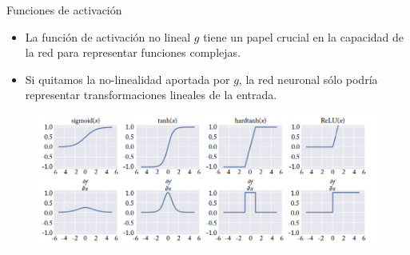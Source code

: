 \documentclass[handout]{beamer}
\begin{document}
\begin{frame}{Funciones de activación}

\begin{scriptsize}
\begin{itemize}
\item La función de activación no lineal $g$ tiene un papel crucial en la capacidad de la red para representar funciones complejas.
\item Si quitamos la no-linealidad aportada por $g$, la red neuronal sólo podría representar transformaciones lineales de la entrada.

\end{itemize}


\end{scriptsize}

\begin{figure}[htb]
	\centering
	 \includegraphics[scale=0.3]{imagenes/activations.png}
\end{figure}


\end{frame}
\end{document}
